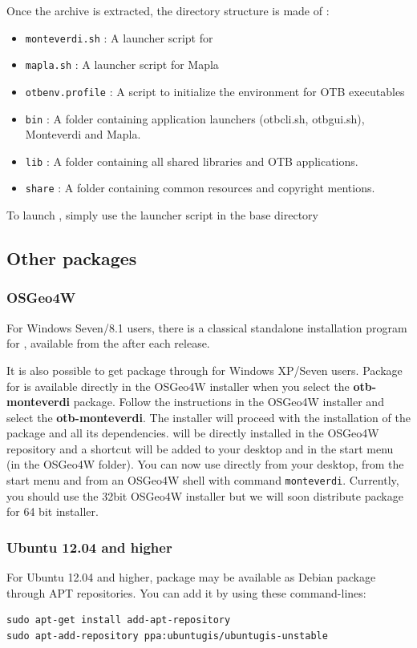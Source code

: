 Once the archive is extracted, the directory structure is made of :
\begin{itemize}
\item \verb?monteverdi.sh? : A launcher script for \mont
\item \verb?mapla.sh? : A launcher script for Mapla
\item \verb?otbenv.profile? : A script to initialize the environment for OTB executables
\item \verb?bin? : A folder containing application launchers (otbcli\textunderscore *.sh,
otbgui\textunderscore *.sh), Monteverdi and Mapla.
\item \verb?lib? : A folder containing all shared libraries and OTB applications.
\item \verb?share? : A folder containing common resources and copyright mentions.
\end{itemize}

To launch \mont, simply use the launcher script in the base directory

\subsection{Other packages}

\subsubsection{OSGeo4W}
For Windows Seven/8.1 users, there is a classical standalone installation program for \mont, available from the \download after each release. 

It is also possible to get \mont package through \osgeow for Windows XP/Seven users. 
Package for \mont is available directly in the OSGeo4W installer when you select the \textbf{otb-monteverdi} package. 
Follow the instructions in the OSGeo4W installer and select the \textbf{otb-monteverdi}. 
The installer will proceed with the installation of the package and all its dependencies. 
\mont will be directly installed in the OSGeo4W repository and a shortcut will be added to your desktop and in the start menu (in the OSGeo4W folder). 
You can now use directly \mont from your desktop, from the start menu and from an OSGeo4W shell with command \texttt{monteverdi}. 
Currently, you should use the 32bit OSGeo4W installer but we will soon distribute \mont package for 64 bit installer.

\subsubsection{Ubuntu 12.04 and higher}
For Ubuntu 12.04 and higher, \mont package may be available as Debian package through APT repositories.
You can add it by using these command-lines:
\begin{verbatim}
sudo apt-get install add-apt-repository
sudo apt-add-repository ppa:ubuntugis/ubuntugis-unstable
\end{verbatim}

